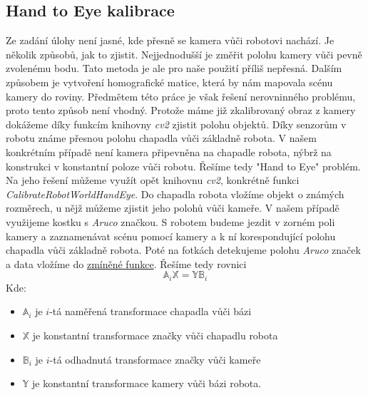 \documentclass[journal,twoside,web]{ieeecolor}
\begin{document}
        \subsection{Hand to Eye kalibrace}
            Ze zadání úlohy není jasné, kde přesně se kamera vůči robotovi nachází. Je několik způsobů, jak to zjistit.
            Nejjednodušší je změřit polohu kamery vůči pevně zvolenému bodu. Tato metoda je ale pro naše použití
            příliš nepřesná. Dalším způsobem je vytvoření homografické matice, která by nám mapovala scénu kamery
            do roviny. Předmětem této práce je však řešení nerovninného problému, proto tento způsob není vhodný.
            Protože máme již zkalibrovaný obraz z kamery dokážeme díky funkcím knihovny \textit{cv2} zjistit polohu
            objektů. Díky senzorům v robotu známe přesnou polohu chapadla vůči základně robota. V našem konkrétním případě
            není kamera připevněna na chapadle robota, nýbrž na konstrukci v konstantní poloze vůči robotu.
            Řešíme tedy "Hand to Eye" problém. Na jeho řešení můžeme využít opět knihovnu \textit{cv2}, konkrétně
            funkci \hypertarget{cv2Handeye}{\textit{CalibrateRobotWorldHandEye}}. Do chapadla robota vložíme objekt o známých rozměrech,
            u nějž můžeme zjistit jeho polohů vůči kameře. V našem případě využijeme kostku s \textit{Aruco} značkou.
            S robotem budeme jezdit v zorném poli kamery a zaznamenávat scénu pomocí kamery a k ní korespondující
            polohu chapadla vůči základně robota. Poté na fotkách detekujeme polohu \textit{Aruco} značek a data vložíme
            do \hyperlink{cv2Handeye}{zmíněné funkce}. Řešíme tedy rovnici
            \begin{equation}
                \mathbb{A}_i \mathbb{X} = \mathbb{Y}\mathbb{B}_i
            \end{equation}
            Kde:
            \begin{itemize}
                \item $\mathbb{A}_i$ je $i$-tá naměřená transformace chapadla vůči bázi\\
                \item $\mathbb{X}$ je konstantní transformace značky vůči chapadlu robota\\
                \item $\mathbb{B}_i$ je $i$-tá odhadnutá transformace značky vůči kameře\\
                \item $\mathbb{Y}$ je konstantní transformace kamery vůči bázi robota.
            \end{itemize}
\end{document}
